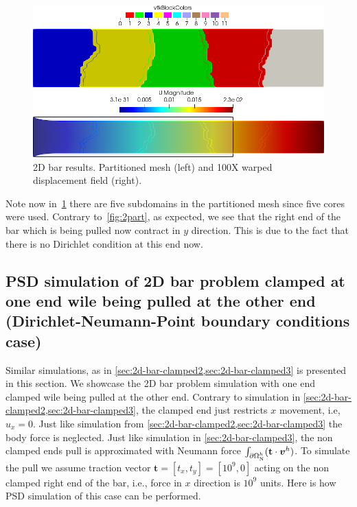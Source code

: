 {{\begin{figure}[htbp]
    \centering
    \begin{minipage}[t][2cm][t]{0.36\textwidth}
    \includegraphics[align=b,width=1\textwidth]{./Images/2d-bar-partitioned5.png}
    \end{minipage}\hspace{.1\textwidth}
    \begin{minipage}[t][2cm][t]{0.5\textwidth}
    \includegraphics[align=b,width=1\textwidth]{./Images/2d-bar-clamped-traction.png}
    \end{minipage}
    \caption{2D bar results. Partitioned mesh (left) and 100X warped displacement field (right).}
    \label{fig:5part}
\end{figure}

Note now in~\cref{fig:5part} there are five subdomains in the partitioned mesh since five cores were used. Contrary to~\cref{fig:2part}, as expected, we see that the right end of the bar which is being pulled now contract in $y$ direction. This is due to the fact that there is no Dirichlet condition at this end now. 

\pagebreak




\subsection{PSD simulation of 2D bar problem clamped at one end wile being pulled at the other end (Dirichlet-Neumann-Point boundary conditions case)\label{sec:2d-bar-clamped4}}


Similar simulations, as in \cref{sec:2d-bar-clamped2,sec:2d-bar-clamped3} is presented in this section. We showcase the 2D bar problem simulation with one end clamped  wile being pulled at the other end. Contrary to simulation in \cref{sec:2d-bar-clamped2,sec:2d-bar-clamped3}, the clamped end just restricts $x$ movement, i.e, $u_x=0$. Just like simulation from \cref{sec:2d-bar-clamped2,sec:2d-bar-clamped3} the body force is neglected. Just like simulation in  \cref{sec:2d-bar-clamped3}, the non clamped ends pull is approximated with Neumann force $\int_{\partial\Omega^h_{\text N}}(\mathbf t\cdot \boldsymbol v^h)$. To simulate the pull we assume traction vector $\mathbf t=[t_x,t_y]=[10^9,0]$ acting on the non clamped right end of the bar, i.e., force in $x$ direction is $10^9$ units. Here is how PSD simulation of this case can be performed.


}}
